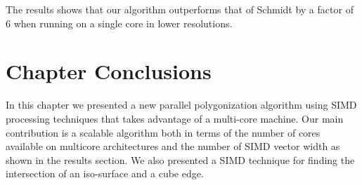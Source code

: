 The results shows that our algorithm outperforms that of Schmidt \etal by a factor of 6 when running on a single core in lower resolutions. 

\section{Chapter Conclusions}\label{sec:futurework}
In this chapter we presented a new parallel polygonization algorithm using SIMD processing techniques that takes advantage of 
a multi-core machine. Our main contribution is a scalable algorithm both in terms of the number of cores available on 
multicore architectures and the number of SIMD vector width as shown in the results section.  We also presented a SIMD technique for 
finding the intersection of an iso-surface and a cube edge.

